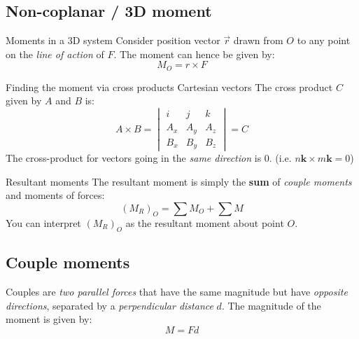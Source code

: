 \documentclass{article}
\begin{document}
\subsection{Non-coplanar / 3D moment}
\begin{definition}
  {Moments in a 3D system}
  Consider position vector $\vec{r}$ drawn from $O$ to any point on the \emph{line of action} of $F$. The moment can hence be given by:
  \[M_O=r\times F\]
\end{definition}
\begin{definition}
  {Finding the moment via cross products Cartesian vectors}
  The cross product $C$ given by $A$ and $B$ is:
  \[A\times B=\begin{vmatrix}
      i   & j   & k   \\
      A_x & A_y & A_z \\
      B_x & B_y & B_z
    \end{vmatrix}=C\]
  The cross-product for vectors going in the \emph{same direction} is 0. (i.e. $n\boldsymbol{k}\times m\boldsymbol{k}=0$)
\end{definition}
\begin{knBox}
  {Resultant moments}
  The resultant moment is simply the \textbf{sum} of \emph{couple moments} and moments of forces:
  \[(M_R)_O=\sum M_O + \sum M\]
  You can interpret $(M_R)_O$ as the resultant moment about point $O$.
\end{knBox}

\subsection{Couple moments}
Couples are \emph{two parallel forces} that have the same magnitude but have \emph{opposite directions}, separated by a \emph{perpendicular distance} $d$. The magnitude of the moment is given by:
\[M=Fd\]
\end{document}
